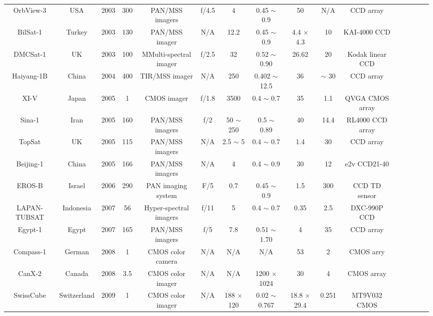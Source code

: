 \documentclass[final,5p,times,twocolumn,authoryear]{elsarticle}
\begin{document}
\begin{table}
{\begin{tabular}{c c c c c c c c c c c c c c c c}
		    OrbView-3 & USA & 2003 & 300 & PAN/MSS imagers & f/4.5 & 4 & 0.45 $\sim$ 0.9 & 50 & N/A & CCD array & \citep{kramer2002observation}\\
		    BilSat-1 & Turkey & 2003 & 130 & PAN/MSS imager & N/A & 12.2 & 0.45 $\sim$ 0.9 &  4.4 $\times$ 4.3 & 10 &   KAI-4000 CCD & \citep{yuksel2005bilsat}\\
		    DMCSat-1 & UK & 2003 & 100 & MMulti-spectral imager &  f/2.5 & 32 & 0.52 $\sim$ 0.90 & 26.62 & 20 & Kodak linear CCD & \citep{eoportal}\\
		    Haiyang-1B & China & 2004 & 400 & TIR/MSS imager & N/A & 250 &  0.402 $\sim$ 12.5 & 36 & $\sim$ 30 & CCD array & \citep{eoportal}\\		
		    XI-V & Japan & 2005 & 1 & CMOS imager  & f/1.8 & 3500 & 0.4 $\sim$ 0.7 &  35 & 1.1 &  QVGA CMOS array & \citep{ FUNASE2007707}\\		     	
		    Sina-1 & Iran & 2005 & 160 & PAN/MSS imagers & f/2 & 50 $\sim$ 250 & 0.5 $\sim$ 0.89 &  40 &14.4 &  RL4000 CCD array & \cite{abolghasemi2012design}\\     
		    TopSat & UK & 2005 & 115 & PAN/MSS imagers & N/A & 2.5 $\sim$ 5 & 0.4 $\sim$ 0.7 &  1.4 & 30  & CCD array & \citep{price2002topsat}\\
		    Beijing-1 & China & 2005 & 166 & PAN/MSS imagers &   N/A & 4 & 0.4 $\sim$ 0.9 &  30 & 12 & e2v CCD21-40 & \citep{da2006small}\\ 
		    EROS-B & Israel & 2006 & 290 & PAN imaging system & F/5 & 0.7 & 0.45 $\sim$ 0.9 &  1.5 & 300 & CCD TD sensor & \citep{eoportal}\\		
		    LAPAN-TUBSAT & Indonesia & 2007 & 56 & Hyper-spectral imagers & f/11 & 5 & 0.4 $\sim$ 0.7 &  0.35 & 2.5 & DXC-990P CCD & \citep{hardhienata2007lapan} \\
		    Egypt-1 & Egypt & 2007 & 165 & PAN/MSS imagers & f/5 & 7.8 & 0.51 $\sim$ 1.70 & 4 & 35 &  CCD array & \citep{metwalli2012combining}\\
		    Compass-1 & German & 2008 & 1 & CMOS color camera & N/A & N/A & N/A & 53 & 2 &   CMOS arry & \citep{scholz2009flight}\\	
		    CanX-2 & Canada & 2008 & 3.5 & CMOS color imager & N/A & N/A & 1200 $\times$ 1024 & 30 & 4 & CMOS array & \citep{ rankin2005canx}\\		    	   
		    SwissCube & Switzerland & 2009 & 1 & CMOS color imager & N/A & 188 $\times$ 120 & 0.02 $\sim$ 0.767 & 18.8 $\times$ 29.4 & 0.251 &  MT9V032 CMOS & \citep{noca2009lessons}\\		

\end{tabular}}
\end{table}
\end{document}
